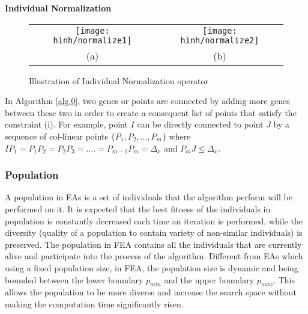 \documentclass[final]{elsarticle}
\begin{document}
\begin{algorithm}[H]
	\SetAlgoLined
		\caption{\textbf{Individual Normalization}} 
		\label{alg.0}
\end{algorithm} 
\begin{figure*}[h]
	\begin{tabular}{cc}
		\texttt{[image: hinh/normalize1]}&\texttt{[image: hinh/normalize2]}\\
		(a) &(b)\\
	\end{tabular}
	\centering
	\caption{Illustration of Individual Normalization operator
	}
	\label{Fig.6}       %
\end{figure*}

In Algorithm \ref*{alg.0}, two genes or points are connected by adding more genes between these two in order to create a consequent list of points that satisfy the constraint (i). For example, point $ I $ can be directly connected to point $ J $ by a sequence of col-linear points $\{P_1,P_2,...,P_m\}$ where $IP_1=P_1P_2=P_2P_3=....=P_{m-1}P_m=\Delta_x$ and $P_mJ \leq \Delta_x$.\\

\subsubsection{Population}

A population in EAs is a set of individuals that the algorithm perform will be performed on it. It is expected that the best fitness of the individuals in population is constantly decreased each time an iteration is performed, while the diversity (quality of a population to contain variety of non-similar individuals) is preserved. The population in FEA contains all the individuals that are currently alive and participate into the process of the algorithm. Different from EAs which using a fixed population size, in FEA, the population size is dynamic and being bounded between the lower boundary $p_{min}$ and the upper boundary $p_{max}$. This allows the population to be more diverse and increase the search space without making the computation time significantly risen.
\end{document}
